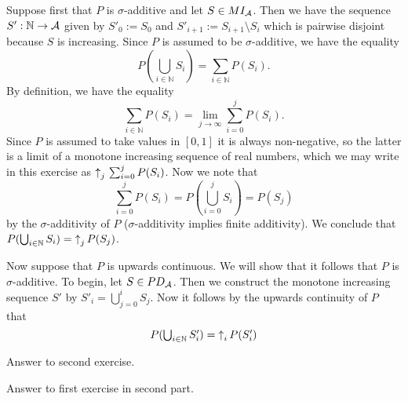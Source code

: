 \documentclass{article}
\begin{document}
\begin{ex}
Suppose first that $P$ is $\sigma$-additive and let $S\in MI_\mathcal{A}$. Then we have the sequence $S':\mathbb{N}\to\mathcal{A}$ given by $S'_0:=S_0$ and $S'_{i+1}:=S_{i+1}\setminus S_i$ which is pairwise disjoint because $S$ is increasing. Since $P$ is assumed to be $\sigma$-additive, we have the equality
\begin{equation*}
\textstyle
P(\bigcup_{i\in\mathbb{N}}S_i)=\sum_{i\in\mathbb{N}}P(S_i).
\end{equation*}
By definition, we have the equality
\begin{equation*}
\sum_{i\in\mathbb{N}}P(S_i)=\lim_{j\to\infty}\sum_{i=0}^j P(S_i).
\end{equation*}
Since $P$ is assumed to take values in $[0,1]$ it is always non-negative, so the latter is a limit of a monotone increasing sequence of real numbers, which we may write in this exercise as ${\uparrow}_j\,\sum_{i=0}^j P(S_i)$. Now we note that 
\begin{equation*}
\textstyle
\sum_{i=0}^j P(S_i) = P(\bigcup_{i=0}^j S_i) = P(S_j)
\end{equation*}
by the $\sigma$-additivity of $P$ ($\sigma$-additivity implies finite additivity). We conclude that $P(\bigcup_{i\in\mathbb{N}}S_i)={\uparrow}_{j}\,{P(S_j)}$.

Now suppose that $P$ is upwards continuous. We will show that it follows that $P$ is $\sigma$-additive. To begin, let $S\in PD_\mathcal{A}$. Then we construct the monotone increasing sequence $S'$ by $S'_i=\bigcup_{j=0}^i S_j$. Now it follows by the upwards continuity of $P$ that
\begin{equation*}
\textstyle
P(\bigcup_{i\in\mathbb{N}}S'_i)={\uparrow}_{i}\,{P(S'_i)}
\end{equation*}

\end{ex}

\begin{ex}
Answer to second exercise.
\end{ex}

\setcounter{ex}{0}

\begin{ex}
Answer to first exercise in second part.
\end{ex}
\end{document}
